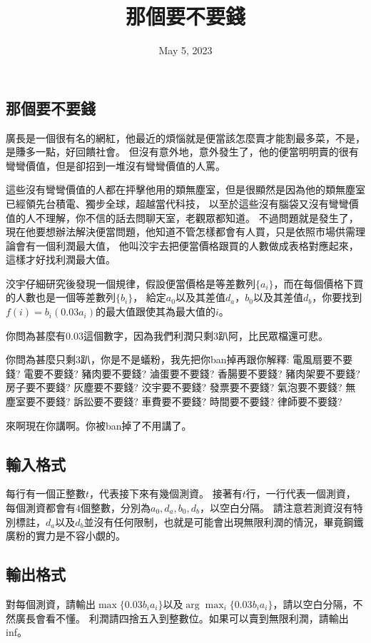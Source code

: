 \documentclass{article}
\title{那個要不要錢}
\date{May 5, 2023}
\begin{document}
\begin{CJK*}{UTF8}{bsmi}

\maketitle

\section*{那個要不要錢}
廣長是一個很有名的網紅，他最近的煩惱就是便當該怎麼賣才能割最多菜，不是，是賺多一點，好回饋社會。
但沒有意外地，意外發生了，他的便當明明賣的很有彎彎價值，但是卻招到一堆沒有彎彎價值的人罵。

這些沒有彎彎價值的人都在抨擊他用的類無塵室，但是很顯然是因為他的類無塵室已經領先台積電、獨步全球，超越當代科技，
以至於這些沒有腦袋又沒有彎彎價值的人不理解，你不信的話去問聊天室，老觀眾都知道。
不過問題就是發生了，現在他要想辦法解決便當問題，他知道不管怎樣都會有人買，只是依照市場供需理論會有一個利潤最大值，
他叫洨宇去把便當價格跟買的人數做成表格對應起來，這樣才好找利潤最大值。

洨宇仔細研究後發現一個規律，假設便當價格是等差數列$\{a_i\}$，而在每個價格下買的人數也是一個等差數列$\{b_i\}$，
給定$a_0$以及其差值$d_a$，$b_0$以及其差值$d_b$，你要找到$f(i)=b_i(0.03a_i)$的最大值跟使其為最大值的$i$。

你問為甚麼有$0.03$這個數字，因為我們利潤只剩$3$趴阿，比民眾檔還可悲。

你問為甚麼只剩$3$趴，你是不是蟻粉，我先把你ban掉再跟你解釋:
電風扇要不要錢? 電要不要錢? 豬肉要不要錢? 滷蛋要不要錢? 香腸要不要錢? 豬肉架要不要錢? 房子要不要錢? 灰塵要不要錢? 
洨宇要不要錢? 發票要不要錢? 氣泡要不要錢? 無塵室要不要錢? 訴訟要不要錢? 車費要不要錢? 時間要不要錢? 律師要不要錢?

來啊現在你講啊。你被ban掉了不用講了。

\subsection*{輸入格式}
每行有一個正整數$t$，代表接下來有幾個測資。
接著有$t$行，一行代表一個測資，每個測資都會有$4$個整數，分別為$a_0,d_a,b_0,d_b$，以空白分隔。
請注意若測資沒有特別標註，$d_a$以及$d_b$並沒有任何限制，也就是可能會出現無限利潤的情況，畢竟鋼鐵廣粉的實力是不容小覷的。

\subsection*{輸出格式}
對每個測資，請輸出$\max\{0.03b_ia_i\}$以及$\arg\max_i\{0.03b_ia_i\}$，請以空白分隔，不然廣長會看不懂。
利潤請四捨五入到整數位。如果可以賣到無限利潤，請輸出inf。


\end{CJK*}
\end{document}
